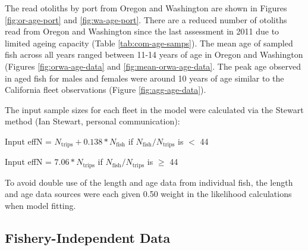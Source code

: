 \documentclass[11pt,
  english,
  a4paper,
]{article}
\begin{document}

The read otoliths by port from Oregon and Washington are shown in Figures \ref{fig:or-age-port} and \ref{fig:wa-age-port}. There are a reduced number of otoliths read from Oregon and Washington since the last assessment in 2011 due to limited ageing capacity (Table \ref{tab:com-age-samps}). The mean age of sampled fish across all years ranged between 11-14 years of age in Oregon and Washington (Figures \ref{fig:orwa-age-data} and \ref{fig:mean-orwa-age-data}. The peak age observed in aged fish for males and females were around 10 years of age similar to the California fleet observations (Figure \ref{fig:agg-age-data}).

\leavevmode\tagmcend\tagstructend\par


The input sample sizes for each fleet in the model were calculated via the Stewart method (Ian Stewart, personal communication):

\leavevmode\tagmcend\tagstructend\par

\begin{centering}

Input effN = $N_{\text{trips}} + 0.138 * N_{\text{fish}}$ if $N_{\text{fish}}/N_{\text{trips}}$ is $<$ 44

Input effN = $7.06 * N_{\text{trips}}$ if $N_{\text{fish}}/N_{\text{trips}}$ is $\geq$ 44

\end{centering}


To avoid double use of the length and age data from individual fish, the length and age data sources were each given 0.50 weight in the likelihood calculations when model fitting.

\leavevmode\tagmcend\tagstructend\par


\hypertarget{fishery-independent-data}{%
\subsection{Fishery-Independent Data}\label{fishery-independent-data}}

\leavevmode\tagmcend\tagstructend
\end{document}
